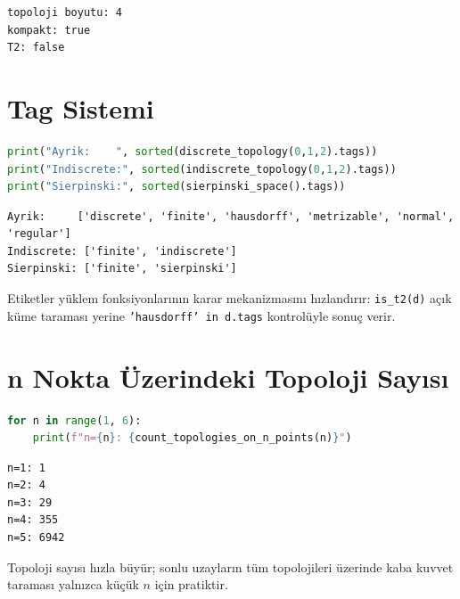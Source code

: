 \begin{verbatim}
topoloji boyutu: 4
kompakt: true
T2: false
\end{verbatim}

\section{Tag Sistemi}

\begin{lstlisting}[language=Python]
print("Ayrik:    ", sorted(discrete_topology(0,1,2).tags))
print("Indiscrete:", sorted(indiscrete_topology(0,1,2).tags))
print("Sierpinski:", sorted(sierpinski_space().tags))
\end{lstlisting}

\begin{verbatim}
Ayrik:     ['discrete', 'finite', 'hausdorff', 'metrizable', 'normal', 'regular']
Indiscrete: ['finite', 'indiscrete']
Sierpinski: ['finite', 'sierpinski']
\end{verbatim}

Etiketler yüklem fonksiyonlarının karar mekanizmasını hızlandırır:
\texttt{is\_t2(d)} açık küme taraması yerine \texttt{'hausdorff' in d.tags}
kontrolüyle sonuç verir.

\section{n Nokta Üzerindeki Topoloji Sayısı}

\begin{lstlisting}[language=Python]
for n in range(1, 6):
    print(f"n={n}: {count_topologies_on_n_points(n)}")
\end{lstlisting}

\begin{verbatim}
n=1: 1
n=2: 4
n=3: 29
n=4: 355
n=5: 6942
\end{verbatim}

Topoloji sayısı hızla büyür; sonlu uzayların tüm topolojileri üzerinde kaba
kuvvet taraması yalnızca küçük $n$ için pratiktir.
